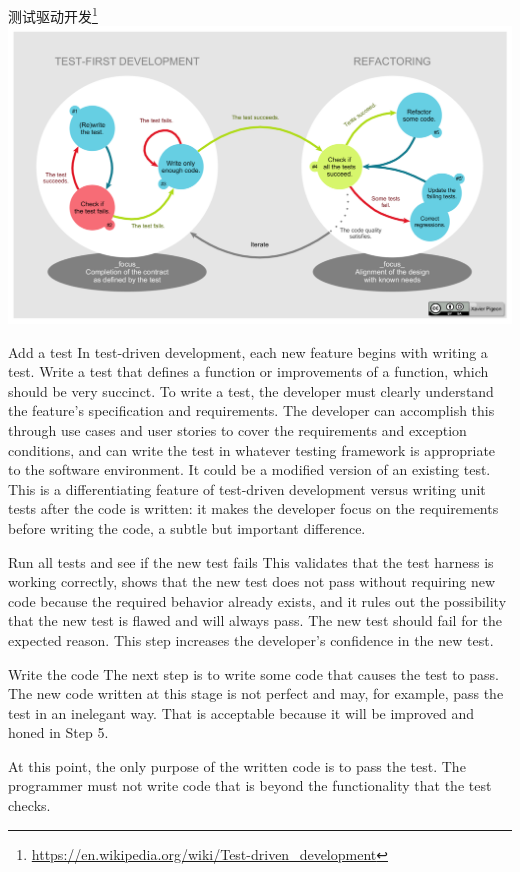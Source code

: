 \documentclass{beamer}
\begin{document}
\begin{frame}[t]{测试驱动开发\footnote{\url{https://en.wikipedia.org/wiki/Test-driven_development}}}
    \includegraphics[width=0.8\linewidth]{images/TDD-Global-Lifecycle.png}
    
\end{frame}

\begin{frame}[t]{Add a test}
In test-driven development, each new feature begins with writing a test. Write a test that defines a function or improvements of a function, which should be very succinct. To write a test, the developer must clearly understand the feature's specification and requirements. The developer can accomplish this through use cases and user stories to cover the requirements and exception conditions, and can write the test in whatever testing framework is appropriate to the software environment. It could be a modified version of an existing test. This is a differentiating feature of test-driven development versus writing unit tests after the code is written: it makes the developer focus on the requirements before writing the code, a subtle but important difference.
    
\end{frame}


\begin{frame}[t]{Run all tests and see if the new test fails}
This validates that the test harness is working correctly, shows that the new test does not pass without requiring new code because the required behavior already exists, and it rules out the possibility that the new test is flawed and will always pass. The new test should fail for the expected reason. This step increases the developer's confidence in the new test.
    
\end{frame}

\begin{frame}[t]{Write the code}
The next step is to write some code that causes the test to pass. The new code written at this stage is not perfect and may, for example, pass the test in an inelegant way. That is acceptable because it will be improved and honed in Step 5.
    
At this point, the only purpose of the written code is to pass the test. The programmer must not write code that is beyond the functionality that the test checks.
\end{frame}
\end{document}
